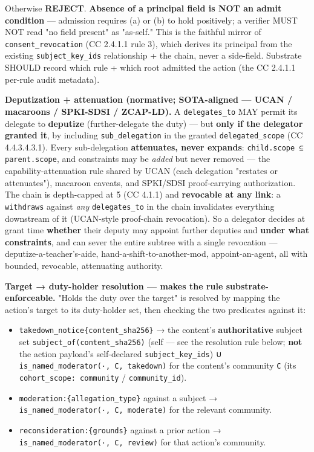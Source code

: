\documentclass[11pt]{article}
\begin{document}
Otherwise \textbf{REJECT}. \textbf{Absence of a principal field is NOT an admit condition} — admission requires (a) or (b) to hold positively; a verifier MUST NOT read "no field present" as "as-self." This is the faithful mirror of \texttt{consent\_revocation} (CC 2.4.1.1 rule 3), which derives its principal from the existing \texttt{subject\_key\_ids} relationship + the chain, never a side-field. Substrate SHOULD record which rule + which root admitted the action (the CC 2.4.1.1 per-rule audit metadata).


\textbf{Deputization + attenuation (normative; SOTA-aligned — UCAN / macaroons / SPKI-SDSI / ZCAP-LD).} A \texttt{delegates\_to} MAY permit its delegate to \textbf{deputize} (further-delegate the duty) — but \textbf{only if the delegator granted it}, by including \texttt{sub\_delegation} in the granted \texttt{delegated\_scope} (CC 4.4.3.4.3.1). Every sub-delegation \textbf{attenuates, never expands}: \texttt{child.scope ⊆ parent.scope}, and constraints may be \textit{added} but never removed — the capability-attenuation rule shared by UCAN (each delegation "restates or attenuates"), macaroon caveats, and SPKI/SDSI proof-carrying authorization. The chain is depth-capped at 5 (CC 4.1.1) and \textbf{revocable at any link}: a \texttt{withdraws} against \textit{any} \texttt{delegates\_to} in the chain invalidates everything downstream of it (UCAN-style proof-chain revocation). So a delegator decides at grant time \textbf{whether} their deputy may appoint further deputies and \textbf{under what constraints}, and can sever the entire subtree with a single revocation — deputize-a-teacher's-aide, hand-a-shift-to-another-mod, appoint-an-agent, all with bounded, revocable, attenuating authority.


\textbf{Target → duty-holder resolution — makes the rule substrate-enforceable.} "Holds the duty over the target" is resolved by mapping the action's target to its duty-holder set, then checking the two predicates against it:


\begin{itemize}\setlength\itemsep{0pt}
\item \texttt{takedown\_notice\{content\_sha256\}} → the content's \textbf{authoritative} subject set \texttt{subject\_of(content\_sha256)} (self — see the resolution rule below; \textbf{not} the action payload's self-declared \texttt{subject\_key\_ids}) ∪ \texttt{is\_named\_moderator(·, C, takedown)} for the content's community \texttt{C} (its \texttt{cohort\_scope: community} / \texttt{community\_id}).
\item \texttt{moderation:\{allegation\_type\}} against a subject → \texttt{is\_named\_moderator(·, C, moderate)} for the relevant community.
\item \texttt{reconsideration:\{grounds\}} against a prior action → \texttt{is\_named\_moderator(·, C, review)} for that action's community.
\end{itemize}
\end{document}
